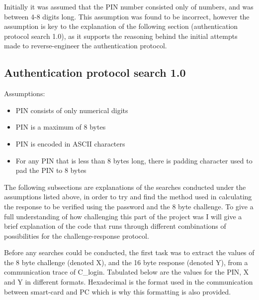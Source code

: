 \documentclass[bsc,frontabs,twoside,singlespacing,parskip,deptreport]{infthesis}     %
\begin{document}


Initially it was assumed that the PIN number consisted only of numbers, and was between 4-8 digits long. This assumption was found to be incorrect, however the assumption is key to the explanation of the following section (authentication protocol search 1.0), as it supports the reasoning behind the initial attempts made to reverse-engineer the authentication protocol. \\

\subsection{Authentication protocol search 1.0}
Assumptions:\\
\begin{itemize}
\item PIN consists of only numerical digits
\item PIN is a maximum of 8 bytes
\item PIN is encoded in ASCII characters
\item For any PIN that is less than 8 bytes long, there is padding character used to pad the PIN to 8 bytes
\end{itemize}

The following subsections are explanations of the searches conducted under the assumptions listed above, in order to try and find the method used in calculating the response to be verified using the password and the 8 byte challenge. To give a full understanding of how challenging this part of the project was I will give a brief explanation of the code that runs through different combinations of possibilities for the challenge-response protocol.

\noindent Before any searches could be conducted, the first task was to extract the values of the 8 byte challenge (denoted X), and the 16 byte response (denoted Y), from a communication trace of C\_login. Tabulated below are the values for the PIN, X and Y in different formats. Hexadecimal is the format used in the communication between smart-card and PC which is why this formatting is also provided. 
\end{document}
